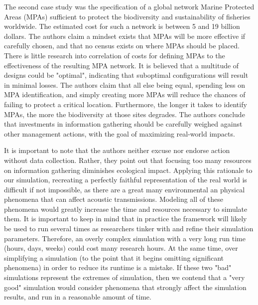 The second case study was the specification of a global network Marine Protected Areas (MPAs) sufficient to protect the biodiversity and sustainability of fisheries worldwide.  The estimated cost for such a network is between 5 and 19 billion dollars.  The authors claim a mindset exists that MPAs will be more effective if carefully chosen, and that no census exists on where MPAs should be placed. There is little research into correlation of costs for defining MPAs to the effectiveness of the resulting MPA network.  It is believed that a multitude of designs could be "optimal", indicating that suboptimal configurations will result in minimal losses.  The authors claim that all else being equal, spending less on MPA identification, and simply creating more MPAs will reduce the chances of failing to protect a critical location.  Furthermore, the longer it takes to identify MPAs, the more the biodiversity at those sites degrades.  The authors conclude that investments in information gathering should be carefully weighed against other management actions, with the goal of maximizing real-world impacts.

It is important to note that the authors neither excuse nor endorse action without data collection.  Rather, they point out that focusing too many resources on information gathering diminishes ecological impact.  Applying this rationale to our simulation, recreating a perfectly faithful representation of the real world is difficult if not impossible, as there are a great many environmental an physical phenomena that can affect acoustic transmissions.  Modeling all of these phenomena would greatly increase the time and resources necessary to simulate them.  It is important to keep in mind that in practice the framework will likely be used to run several times as researchers tinker with and refine their simulation parameters.  Therefore, an overly complex simulation with a very long run time (hours, days, weeks) could cost many research hours. At the same time, over simplifying a simulation (to the point that it begins omitting significant phenomena) in order to reduce its runtime is a mistake.  If these two "bad" simulations represent the extremes of simulation, then  we contend that a "very good" simulation would consider phenomena that strongly affect the simulation results, and run in a reasonable amount of time.  



